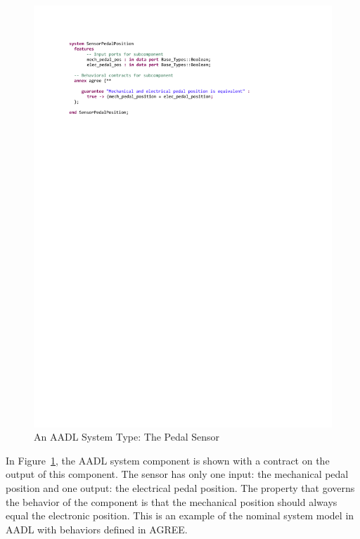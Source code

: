 \begin{figure}[h!]
	\hspace*{-2cm}
	\vspace{-0.4in} 
	\begin{center}
		\includegraphics[trim=0 640 -10 70,clip,width=1.5\dimexpr\textwidth-2cm\relax]{images/system_sensor.pdf}
		\caption{An AADL System Type: The Pedal Sensor}
		\label{fig:sensor}
	\end{center}
	\vspace{-0.3in}
\end{figure}

 In Figure~\ref{fig:sensor}, the AADL system component is shown with a contract on the output of this component. The sensor has only one input: the mechanical pedal position and one output: the electrical pedal position. The property that governs the behavior of the component is that the mechanical position should always equal the electronic position. This is an example of the nominal system model in AADL with behaviors defined in AGREE. 

